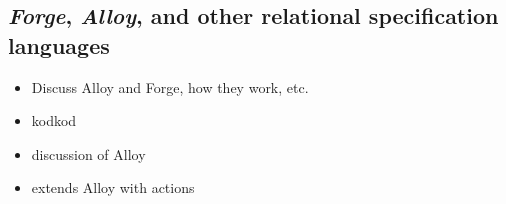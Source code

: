 \subsection{\emph{Forge}, \emph{Alloy}, and other relational specification languages}
\begin{itemize}
    \item Discuss Alloy and Forge, how they work, etc. 
    \item \cite{torlak2007kodkod} kodkod
    \item \cite{torlak2013applications} discussion of Alloy
    \item \cite{frias2005dynalloy} extends Alloy with actions
\end{itemize}
